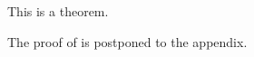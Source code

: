 \begin{theorem}\label{thm}
  This is a theorem.
\end{theorem}

The proof of  is postponed to the appendix.